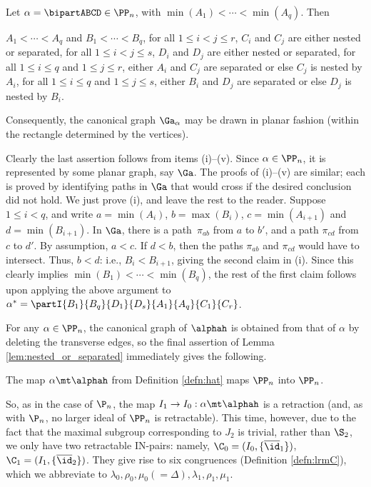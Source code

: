 \begin{lemma}\label{lem:nested_or_separated}
Let $\alpha=\bipartABCD\in\PP_n$, with $\min(A_1)<\cdots<\min(A_q)$.  Then
\begin{itemize}
 $A_1<\cdots<A_q$ and $B_1<\cdots<B_q$,
 for all $1\leq i<j\leq r$, $C_i$ and $C_j$ are either nested or separated,
 for all $1\leq i<j\leq s$, $D_i$ and $D_j$ are either nested or separated,
 for all $1\leq i\leq q$ and $1\leq j\leq r$, either $A_i$ and $C_j$ are separated or else $C_j$ is nested by $A_i$, 
 for all $1\leq i\leq q$ and $1\leq j\leq s$, either $B_i$ and $D_j$ are separated or else $D_j$ is nested by $B_i$.
\end{itemize}
Consequently, the canonical graph $\Ga_\alpha$ may be drawn in planar fashion (within the rectangle determined by the vertices).
\end{lemma}

\pf Clearly the last assertion follows from items (i)--(v).  Since $\alpha\in\PP_n$, it is represented by some planar graph, say $\Ga$.
%
The proofs of (i)--(v) are similar; each is proved by identifying paths in
$\Ga$ that would cross if the desired conclusion did not hold.  We just prove
(i), and leave the rest to the reader.  Suppose $1\leq i<q$, and write $a=\min(A_i)$, $b=\max(B_i)$, $c=\min(A_{i+1})$ and $d=\min(B_{i+1})$.  In $\Ga$, there is a path~$\pi_{ab}$ from $a$ to $b'$, and a path $\pi_{cd}$ from $c$ to $d'$.  By assumption, $a<c$.  If $d<b$, then the paths $\pi_{ab}$ and $\pi_{cd}$ would have to intersect.  Thus, $b<d$: i.e., $B_i<B_{i+1}$, giving the second claim in (i).  Since this clearly implies $\min(B_1)<\cdots<\min(B_q)$, the rest of the first claim follows upon applying the above argument to $\alpha^*=\partI{B_1}{B_q}{D_1}{D_s}{A_1}{A_q}{C_1}{C_r}$. \epf

For any $\alpha\in\PP_n$, the canonical graph of $\alphah$ is obtained from that of $\alpha$ by deleting the transverse edges, so the final assertion of Lemma \ref{lem:nested_or_separated} immediately gives the following.


\begin{cor}
\label{cor:retract_planar}
The map $\alpha\mt\alphah$ from Definition \ref{defn:hat} maps $\PP_n$ into $\PP_n$. \epfres
\end{cor}

So, as in the case of $\P_n$, the map $I_1\to I_0:\alpha\mt\alphah$ is a retraction (and, as with $\P_n$, no larger ideal of $\PP_n$ is retractable).
This time, however, due to the fact that the maximal subgroup corresponding to $J_2$ is trivial, rather than $\S_2$, we only have two retractable IN-pairs: namely,
$\C_0=(I_0,\{\overline{\id}_1\})$,
$\C_1=(I_1,\{\overline{\id}_2\})$.
They give rise to six congruences (Definition \ref{defn:lrmC}), which we abbreviate to $\lambda_0,\rho_0,\mu_0(=\Delta),\lambda_1,\rho_1,\mu_1$.

